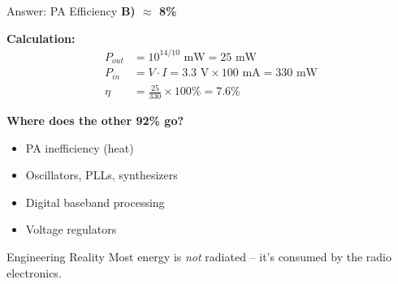 \documentclass[aspectratio=169,11pt]{beamer}
\begin{document}
\begin{frame}{Answer: PA Efficiency}
    \textbf{B) $\approx$ 8\%}
    
    \vspace{0.3cm}
    \textbf{Calculation:}
    \begin{align*}
        P_{out} &= 10^{14/10} \text{ mW} = 25 \text{ mW} \\
        P_{in} &= V \cdot I = 3.3 \text{ V} \times 100 \text{ mA} = 330 \text{ mW} \\
        \eta &= \frac{25}{330} \times 100\% = 7.6\%
    \end{align*}
    
    \vspace{0.3cm}
    \textbf{Where does the other 92\% go?}
    \begin{itemize}
        \item PA inefficiency (heat)
        \item Oscillators, PLLs, synthesizers
        \item Digital baseband processing
        \item Voltage regulators
    \end{itemize}
    
    \vspace{0.2cm}
    \begin{alertblock}{Engineering Reality}
        Most energy is \textit{not} radiated -- it's consumed by the radio electronics.
    \end{alertblock}
\end{frame}
\end{document}
